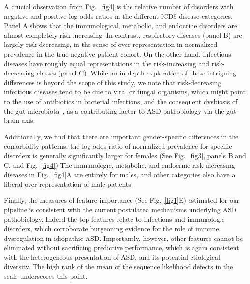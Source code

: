 \documentclass[onecolumn,,10pt]{IEEEtran}
\begin{document}
A crucial observation from Fig.~\ref{fig4} is the relative number of disorders with negative and positive log-odds ratios in the different ICD9 disease categories. Panel A shows that the immunological, metabolic, and endocrine disorders are almost completely risk-increasing. In contrast, respiratory diseases (panel B) are largely risk-decreasing, in the sense of over-representation in normalized prevalence in the true-negative patient cohort. On the other hand, infectious diseases have roughly equal representations in the risk-increasing and risk-decreasing classes (panel C). While an in-depth exploration of these intriguing differences is beyond the scope of this study, we note that risk-decreasing infectious diseases tend to be due to viral or fungal organisms, which might point to the use of antibiotics in bacterial infections, and the consequent dysbiosis of the gut microbiota~\cite{pmid30823414,pmid27957319}, as a contributing factor to ASD pathobiology via the gut-brain axis.

 Additionally, we find that there are important gender-specific differences in the
 comorbidity patterns: the log-odds ratio of normalized prevalence for specific disorders is generally significantly larger for females (See Fig.~\ref{fig3}, panels B and  C, and Fig.~\ref{fig4})
The immunologic, metabolic, and endocrine  risk-increasing  diseases in Fig.~\ref{fig4}A are entirely for males, and other categories also have a liberal over-representation of male patients.

Finally, the measures of feature importance (See Fig.~\ref{fig1}E) estimated for our pipeline is consistent with the current postulated mechanisms underlying ASD pathobiology. Indeed the top features relate to infections and immunologic disorders, which corroborate burgeoning evidence for the role of immune dysregulation in idiopathic ASD. Importantly, however, other features cannot be eliminated without sacrificing predictive performance, which is again consistent with the heterogeneous presentation of ASD, and its potential etiological diversity. The high rank of the mean  of the  sequence likelihood defects in the scale underscores this point.
\end{document}
